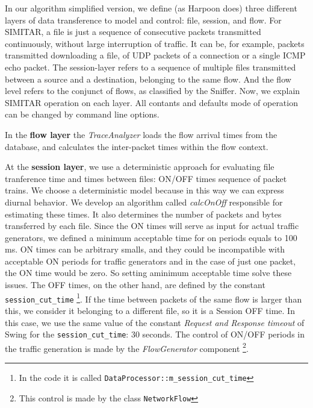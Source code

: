 In our algorithm simplified version, we define (as Harpoon does) three different layers of data transference to model and control: file, session, and flow. For SIMITAR, a file is just a sequence of consecutive packets transmitted continuously, without large interruption of traffic. It can be, for example, packets transmitted downloading a file, of UDP packets of a connection or a single ICMP echo packet. The session-layer refers to a sequence of multiple files transmitted between a source and a destination, belonging to the same flow.  And the flow level refers to the conjunct of flows, as classified by the Sniffer.  Now, we explain SIMITAR operation on each layer. All contants and defaults mode of operation can be changed by command line options.


In the \textbf{flow layer} the \textit{TraceAnalyzer} loads the flow arrival times from the database, and calculates the inter-packet times within the flow context. 


At the \textbf{session layer}, we use a deterministic approach for evaluating file tranference time and times between files: ON/OFF times sequence of packet trains. We choose a deterministic model because in this way we can express diurnal behavior\cite{harpoon-paper}.  We develop an algorithm called \textit{calcOnOff} responsible for estimating these times. It also determines the number of packets and bytes transferred by each file. Since the ON times will serve as input for actual traffic generators, we defined a minimum acceptable time for on periods equals to 100 ms. ON times can be arbitrary smalls, and they could be incompatible with acceptable ON periods for traffic generators and in the case of just one packet, the ON time would be zero. So setting aminimum acceptable time solve these issues. The OFF times, on the other hand, are defined by the constant \texttt{session\_cut\_time} \footnote{In the code it is called \texttt{DataProcessor::m\_session\_cut\_time} }. If the time between packets of the same flow is larger than this, we consider it belonging to a different file, so it is a Session OFF time. In this case, we use the same value of the constant \textit{Request and Response timeout} of Swing\cite{swing-paper} for the \texttt{session\_cut\_time}: 30 seconds. The control of ON/OFF periods in the traffic generation is made by the \textit{FlowGenerator} component \footnote{This control is made by the class \texttt{NetworkFlow}}.

